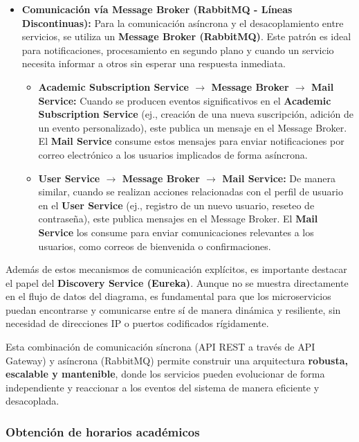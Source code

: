 \begin{itemize}
    \item \textbf{Comunicación vía Message Broker (RabbitMQ - Líneas Discontinuas):}
    Para la comunicación asíncrona y el desacoplamiento entre servicios, se utiliza un \textbf{Message Broker (RabbitMQ)}. Este patrón es ideal para notificaciones, procesamiento en segundo plano y cuando un servicio necesita informar a otros sin esperar una respuesta inmediata.
    \begin{itemize}
        \item \textbf{Academic Subscription Service $\rightarrow$ Message Broker $\rightarrow$ Mail Service:} Cuando se producen eventos significativos en el \textbf{Academic Subscription Service} (ej., creación de una nueva suscripción, adición de un evento personalizado), este publica un mensaje en el Message Broker. El \textbf{Mail Service} consume estos mensajes para enviar notificaciones por correo electrónico a los usuarios implicados de forma asíncrona.
        \item \textbf{User Service $\rightarrow$ Message Broker $\rightarrow$ Mail Service:} De manera similar, cuando se realizan acciones relacionadas con el perfil de usuario en el \textbf{User Service} (ej., registro de un nuevo usuario, reseteo de contraseña), este publica mensajes en el Message Broker. El \textbf{Mail Service} los consume para enviar comunicaciones relevantes a los usuarios, como correos de bienvenida o confirmaciones.
    \end{itemize}
\end{itemize}

Además de estos mecanismos de comunicación explícitos, es importante destacar el papel del \textbf{Discovery Service (Eureka)}. Aunque no se muestra directamente en el flujo de datos del diagrama, es fundamental para que los microservicios puedan encontrarse y comunicarse entre sí de manera dinámica y resiliente, sin necesidad de direcciones IP o puertos codificados rígidamente.

Esta combinación de comunicación síncrona (API REST a través de API Gateway) y asíncrona (RabbitMQ) permite construir una arquitectura \textbf{robusta, escalable y mantenible}, donde los servicios pueden evolucionar de forma independiente y reaccionar a los eventos del sistema de manera eficiente y desacoplada.

\subsubsection{Obtención de horarios académicos}

